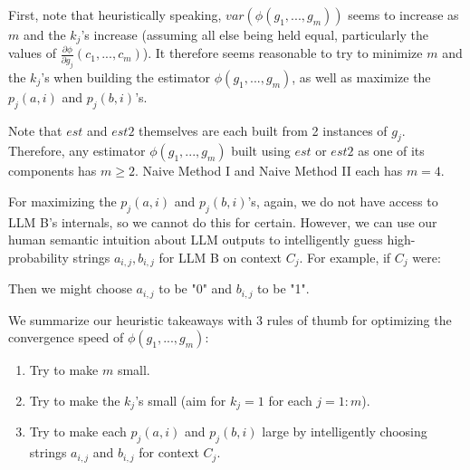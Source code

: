 \documentclass{article}
\begin{document}
First, note that heuristically speaking, $\displaystyle var\left( \phi \left( g_{1} ,...,g_{m}\right)\right)$ seems to increase as $\displaystyle m$ and the $\displaystyle k_{j}$'s increase (assuming all else being held equal, particularly the values of $\displaystyle \frac{\partial \phi }{\partial g_{j}}\left( c_{1} ,...,c_{m}\right)$). It therefore seems reasonable to try to minimize $\displaystyle m$ and the $\displaystyle k_{j}$'s when building the estimator $\displaystyle \phi \left( g_{1} ,...,g_{m}\right)$, as well as maximize the $\displaystyle p_{j}\left( a,i\right)$ and $\displaystyle p_{j}\left( b,i\right)$'s.



Note that $\displaystyle est$ and $\displaystyle est2$ themselves are each built from 2 instances of $\displaystyle g_{j}$. Therefore, any estimator $\displaystyle \phi \left( g_{1} ,...,g_{m}\right)$ built using $\displaystyle est$ or $\displaystyle est2$ as one of its components has $\displaystyle m\geqslant 2$. Naive Method I and Naive Method II each has $\displaystyle m=4$.



For maximizing the $\displaystyle p_{j}\left( a,i\right)$ and $\displaystyle p_{j}\left( b,i\right)$'s, again, we do not have access to LLM B's internals, so we cannot do this for certain. However, we can use our human semantic intuition about LLM outputs to intelligently guess high-probability strings $\displaystyle a_{i,j} ,b_{i,j}$ for LLM B on context $\displaystyle C_{j}$. For example, if $\displaystyle C_{j}$ were:

Then we might choose $\displaystyle a_{i,j}$ to be "0" and $\displaystyle b_{i,j}$ to be "1".



We summarize our heuristic takeaways with 3 rules of thumb for optimizing the convergence speed of $\displaystyle \phi \left( g_{1} ,...,g_{m}\right)$:
\begin{enumerate}
\item Try to make $\displaystyle m$ small.
\item Try to make the $\displaystyle k_{j}$'s small (aim for $\displaystyle k_{j} =1$ for each $\displaystyle j=1:m$).
\item Try to make each $\displaystyle p_{j}\left( a,i\right)$ and $\displaystyle p_{j}\left( b,i\right)$ large by intelligently choosing strings $\displaystyle a_{i,j}$ and $\displaystyle b_{i,j}$ for context $\displaystyle C_{j}$.
\end{enumerate}
\end{document}
